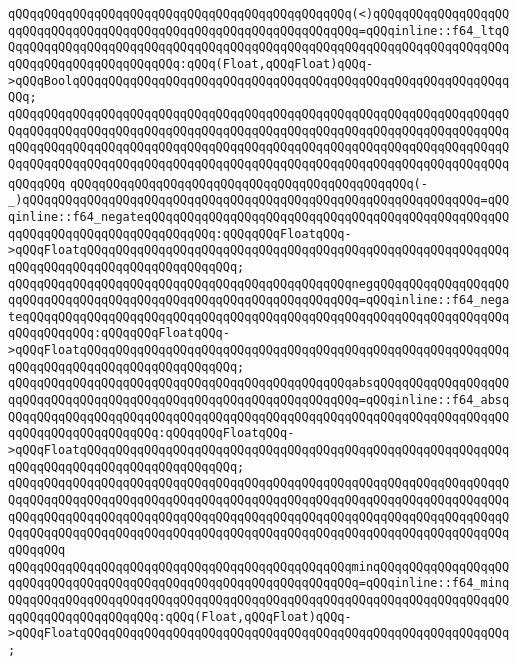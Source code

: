 \verb|qQQqqQQqqQQqqQQqqQQqqQQqqQQqqQQqqQQqqQQqqQQqqQQq(<)qQQqqQQqqQQqqQQqqQQqqQQqqQQqqQQqqQQqqQQqqQQqqQQqqQQqqQQqqQQqqQQqqQQq=qQQqinline::f64_ltqQQqqQQqqQQqqQQqqQQqqQQqqQQqqQQqqQQqqQQqqQQqqQQqqQQqqQQqqQQqqQQqqQQqqQQqqQQqqQQqqQQqqQQqqQQqqQQq:qQQq(Float,qQQqFloat)qQQq->qQQqBoolqQQqqQQqqQQqqQQqqQQqqQQqqQQqqQQqqQQqqQQqqQQqqQQqqQQqqQQqqQQqqQQq;|\newline
\verb|qQQqqQQqqQQqqQQqqQQqqQQqqQQqqQQqqQQqqQQqqQQqqQQqqQQqqQQqqQQqqQQqqQQqqQQqqQQqqQQqqQQqqQQqqQQqqQQqqQQqqQQqqQQqqQQqqQQqqQQqqQQqqQQqqQQqqQQqqQQqqQQqqQQqqQQqqQQqqQQqqQQqqQQqqQQqqQQqqQQqqQQqqQQqqQQqqQQqqQQqqQQqqQQqqQQqqQQqqQQqqQQqqQQqqQQqqQQqqQQqqQQqqQQqqQQqqQQqqQQqqQQqqQQqqQQqqQQqqQQqqQQqqQQq|\newline
\verb|qQQqqQQqqQQqqQQqqQQqqQQqqQQqqQQqqQQqqQQqqQQqqQQq(-_)qQQqqQQqqQQqqQQqqQQqqQQqqQQqqQQqqQQqqQQqqQQqqQQqqQQqqQQqqQQqqQQq=qQQqinline::f64_negateqQQqqQQqqQQqqQQqqQQqqQQqqQQqqQQqqQQqqQQqqQQqqQQqqQQqqQQqqQQqqQQqqQQqqQQqqQQqqQQq:qQQqqQQqFloatqQQq->qQQqFloatqQQqqQQqqQQqqQQqqQQqqQQqqQQqqQQqqQQqqQQqqQQqqQQqqQQqqQQqqQQqqQQqqQQqqQQqqQQqqQQqqQQqqQQqqQQq;|\newline
\verb|qQQqqQQqqQQqqQQqqQQqqQQqqQQqqQQqqQQqqQQqqQQqqQQqnegqQQqqQQqqQQqqQQqqQQqqQQqqQQqqQQqqQQqqQQqqQQqqQQqqQQqqQQqqQQqqQQqqQQq=qQQqinline::f64_negateqQQqqQQqqQQqqQQqqQQqqQQqqQQqqQQqqQQqqQQqqQQqqQQqqQQqqQQqqQQqqQQqqQQqqQQqqQQqqQQq:qQQqqQQqFloatqQQq->qQQqFloatqQQqqQQqqQQqqQQqqQQqqQQqqQQqqQQqqQQqqQQqqQQqqQQqqQQqqQQqqQQqqQQqqQQqqQQqqQQqqQQqqQQqqQQqqQQq;|\newline
\verb|qQQqqQQqqQQqqQQqqQQqqQQqqQQqqQQqqQQqqQQqqQQqqQQqabsqQQqqQQqqQQqqQQqqQQqqQQqqQQqqQQqqQQqqQQqqQQqqQQqqQQqqQQqqQQqqQQqqQQq=qQQqinline::f64_absqQQqqQQqqQQqqQQqqQQqqQQqqQQqqQQqqQQqqQQqqQQqqQQqqQQqqQQqqQQqqQQqqQQqqQQqqQQqqQQqqQQqqQQqqQQq:qQQqqQQqFloatqQQq->qQQqFloatqQQqqQQqqQQqqQQqqQQqqQQqqQQqqQQqqQQqqQQqqQQqqQQqqQQqqQQqqQQqqQQqqQQqqQQqqQQqqQQqqQQqqQQqqQQq;|\newline
\verb|qQQqqQQqqQQqqQQqqQQqqQQqqQQqqQQqqQQqqQQqqQQqqQQqqQQqqQQqqQQqqQQqqQQqqQQqqQQqqQQqqQQqqQQqqQQqqQQqqQQqqQQqqQQqqQQqqQQqqQQqqQQqqQQqqQQqqQQqqQQqqQQqqQQqqQQqqQQqqQQqqQQqqQQqqQQqqQQqqQQqqQQqqQQqqQQqqQQqqQQqqQQqqQQqqQQqqQQqqQQqqQQqqQQqqQQqqQQqqQQqqQQqqQQqqQQqqQQqqQQqqQQqqQQqqQQqqQQqqQQqqQQqqQQq|\newline
\verb|qQQqqQQqqQQqqQQqqQQqqQQqqQQqqQQqqQQqqQQqqQQqqQQqminqQQqqQQqqQQqqQQqqQQqqQQqqQQqqQQqqQQqqQQqqQQqqQQqqQQqqQQqqQQqqQQqqQQq=qQQqinline::f64_minqQQqqQQqqQQqqQQqqQQqqQQqqQQqqQQqqQQqqQQqqQQqqQQqqQQqqQQqqQQqqQQqqQQqqQQqqQQqqQQqqQQqqQQqqQQq:qQQq(Float,qQQqFloat)qQQq->qQQqFloatqQQqqQQqqQQqqQQqqQQqqQQqqQQqqQQqqQQqqQQqqQQqqQQqqQQqqQQqqQQq;|\newline
